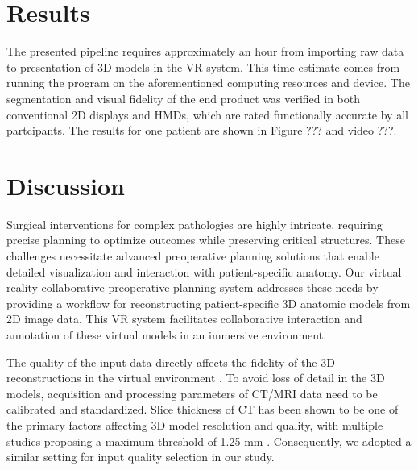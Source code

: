 \documentclass{bmcart}
\begin{document}
\section{Results}
The presented pipeline requires approximately an hour from importing raw data to presentation of 3D models in the VR system. This time estimate comes from running the program on the aforementioned computing resources and device. 
The segmentation and visual fidelity of the end product was verified in both conventional 2D displays and HMDs, which are rated functionally accurate by all partcipants. The results for one patient are shown in Figure ??? and video ???. 
\section{Discussion}
Surgical interventions for complex pathologies are highly intricate, requiring precise planning to optimize outcomes while preserving critical structures. These challenges necessitate advanced preoperative planning solutions that enable detailed visualization and interaction with patient-specific anatomy. Our virtual reality collaborative preoperative planning system addresses these needs by providing a workflow for reconstructing patient-specific 3D anatomic models from 2D image data. This VR system facilitates collaborative interaction and annotation of these virtual models in an immersive environment.

The quality of the input data directly affects the fidelity of the 3D reconstructions in the virtual environment \cite{RN7, RN45}. To avoid loss of detail in the 3D models, acquisition and processing parameters of CT/MRI data need to be calibrated and standardized. Slice thickness of CT has been shown to be one of the primary factors affecting 3D model resolution and quality, with multiple studies proposing a maximum threshold of 1.25 mm \cite{RN7, RN47}. Consequently, we adopted a similar setting for input quality selection in our study.
\end{document}

